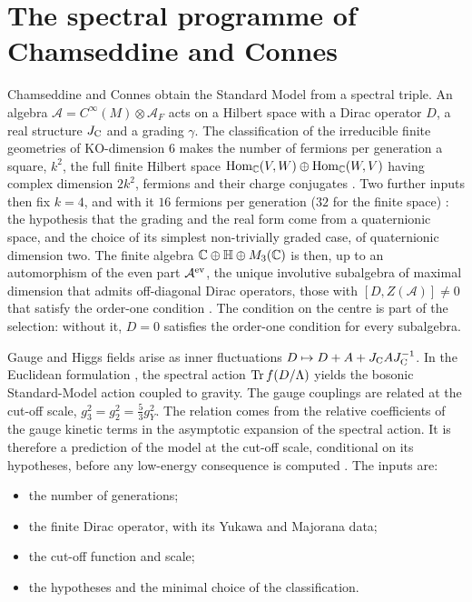 \section{The spectral programme of Chamseddine and Connes}
\label{sec:rel:connes}

Chamseddine and Connes obtain the Standard Model from a spectral triple. An algebra $\mathcal A=C^\infty(M)\otimes\mathcal A_F$ acts on a
Hilbert space with a Dirac operator $D$, a real structure $J_{\rm C}$ and a grading $\gamma$. The classification of the irreducible finite
geometries of KO-dimension $6$ makes the number of fermions per generation a square, $k^2$, the full finite Hilbert space
$\operatorname{Hom}_{\mathbb{C}}(V,W)\oplus\operatorname{Hom}_{\mathbb{C}}(W,V)$ having complex dimension $2k^2$, fermions and their charge conjugates
\cite{ChamseddineConnes07,ChamseddineConnes08}. Two further inputs then fix $k=4$, and with it $16$ fermions per generation ($32$ for the finite space)
\cite[\S3]{ChamseddineConnes08}: the hypothesis that the grading and the real form come from a quaternionic space, and the choice of its
simplest non-trivially graded case, of quaternionic dimension two. The finite algebra $\mathbb{C}\oplus\mathbb H\oplus M_3(\mathbb{C})$ is then, up to an
automorphism of the even part $\mathcal A^{\rm ev}$, the unique involutive subalgebra of maximal dimension that admits off-diagonal Dirac
operators, those with $[D,Z(\mathcal A)]\neq0$ that satisfy the order-one condition \cite[Thm.~4.1]{ChamseddineConnes08}. The condition on the
centre is part of the selection: without it, $D=0$ satisfies the order-one condition for every subalgebra.

Gauge and Higgs fields arise as inner fluctuations $D\mapsto D+A+J_{\rm C}AJ_{\rm C}^{-1}$. In the Euclidean formulation
\cite{ChamseddineConnes96,ChamseddineConnes,ChamseddineConnesMarcolli07}, the spectral action $\operatorname{Tr} f(D/\Lambda)$ yields the bosonic
Standard-Model action coupled to gravity. The gauge couplings are related at the cut-off scale, $g_3^2=g_2^2=\tfrac53g_Y^2$. The relation comes
from the relative coefficients of the gauge kinetic terms in the asymptotic expansion of the spectral action. It is therefore a prediction of
the model at the cut-off scale, conditional on its hypotheses, before any low-energy consequence is computed \cite{ChamseddineConnesMarcolli07}.
The inputs are:
\begin{itemize}
\item the number of generations;
\item the finite Dirac operator, with its Yukawa and Majorana data;
\item the cut-off function and scale;
\item the hypotheses and the minimal choice of the classification.
\end{itemize}

